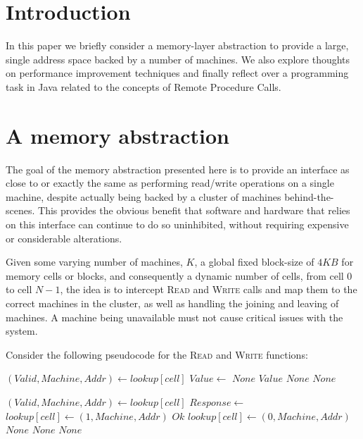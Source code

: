 \section{Introduction}
In this paper we briefly consider a memory-layer abstraction to provide
a large, single address space backed by a number of machines. We also explore
thoughts on performance improvement techniques and finally reflect over a
programming task in Java related to the concepts of Remote Procedure Calls.

\section{A memory abstraction}
The goal of the memory abstraction presented here is to provide an interface 
as close to or exactly the same as performing read/write operations on a single
machine, despite actually being backed by a cluster of machines
behind-the-scenes. This provides the obvious benefit that software and hardware
that relies on this interface can continue to do so uninhibited, without
requiring expensive or considerable alterations.

Given some varying number of machines, $K$, a global fixed block-size of $4KB$
for memory cells or blocks, and consequently a dynamic number of cells, from
cell 0 to cell $N-1$, the idea is to intercept \textsc{Read} and \textsc{Write}
calls and map them to the correct machines in the cluster, as well as handling
the joining and leaving of machines. A machine being unavailable must not cause
critical issues with the system.

Consider the following pseudocode for the \textsc{Read} and \textsc{Write}
functions:

\begin{algorithmic}
        \State $(Valid, Machine, Addr) \gets lookup[cell]$
            \State $Value \gets$ 
                \State \Return $None$
            \Else
                \State \Return $Value$
            \EndIf
        \Else
            \State \Return $None$
        \EndIf
    \Else
        \State \Return $None$
    \EndIf
\EndFunction
\Statex

        \State $(Valid, Machine, Addr) \gets lookup[cell]$
            \State $Response \gets$ 
                \State $lookup[cell] \gets (1, Machine, Addr)$
                \State \Return $Ok$
            \Else
                \State $lookup[cell] \gets (0, Machine, Addr)$
                \State \Return $None$
            \EndIf
        \Else
            \State \Return $None$
        \EndIf
    \Else
        \State \Return $None$
    \EndIf
\EndFunction
\end{algorithmic}

